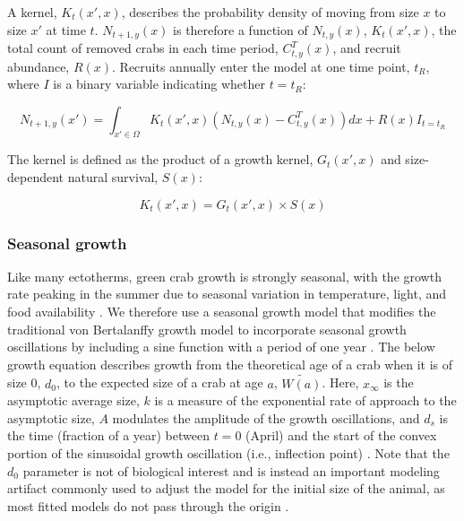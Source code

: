\documentclass{article}
\begin{document}
A kernel, $K_{t}(x', x)$, describes the probability density of moving from size $x$ to size $x'$ at time $t$. $N_{t+1,y}(x)$ is therefore a function of $N_{t,y}(x)$, $K_{t}(x', x)$, the total count of removed crabs in each time period, $C_{t,y}^T(x)$, and recruit abundance, $R(x)$. Recruits annually enter the model at one time point, $t_R$, where $I$ is a binary variable indicating whether $t = t_R$:

\begin{equation}
N_{t+1,y}(x') = \int_{x' \in \Omega} K_{t}(x',x) (N_{t,y}(x) - C_{t,y}^T(x)) dx + R(x)I_{t = t_R}
\end{equation}

The kernel is defined as the product of a growth kernel, $G_t(x',x)$ and size-dependent natural survival, $S(x)$:

\begin{equation}
K_{t}(x',x) = G_t(x',x) \times S(x)
\end{equation}

\subsubsection*{Seasonal growth}

Like many ectotherms, green crab growth is strongly seasonal, with the growth rate peaking in the summer due to seasonal variation in temperature, light, and food availability \parencite{contreras2003population, garcia2012technical}. We therefore use a seasonal growth model that modifies the traditional von Bertalanffy growth model to incorporate seasonal growth oscillations by including a sine function with a period of one year \parencite{beverton2012dynamics, somers1988seasonally}. The below growth equation describes growth from the theoretical age of a crab when it is of size 0, $d_0$, to the expected size of a crab at age $a$, $\widetilde{W(a)}$. Here, $x_{\infty}$ is the asymptotic average size, $k$ is a measure of the exponential rate of approach to the asymptotic size, $A$ modulates the amplitude of the growth oscillations, and $d_s$ is the time (fraction of a year) between $t = 0$ (April) and the start of the convex portion of the sinusoidal growth oscillation (i.e., inflection point) \parencite{garcia2012technical}. Note that the $d_0$ parameter is not of biological interest and is instead an important modeling artifact commonly used to adjust the model for the initial size of the animal, as most fitted models do not pass through the origin \parencite{garcia2012technical, schnute1980new}.
\end{document}
